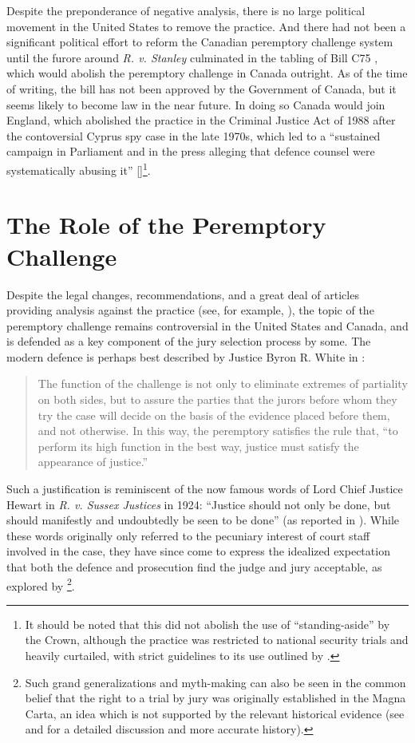 Despite the preponderance of negative analysis, there is no large political movement in the United States to remove the
practice. And there had not been a significant political effort to reform the Canadian peremptory challenge system until the
furore around \textit{R. v. Stanley} culminated in the tabling of Bill C75 \cite{c75legisinfo}, which would abolish the peremptory
challenge in Canada outright. As of the time of writing, the bill has not been approved by the Government of Canada, but it seems
likely to become law in the near future. In doing so Canada would join England, which abolished the practice in the Criminal
Justice Act of 1988 after the contoversial Cyprus spy case in the late 1970s, which led to a ``sustained campaign in Parliament
and in the press alleging that defence counsel were systematically abusing it'' [\cite{hoffman1997}]\footnote{It should be noted
  that this did not abolish the use of ``standing-aside'' by the Crown, although the practice was restricted to national security
  trials and heavily curtailed, with strict guidelines to its use outlined by \cite{attgenguide}.}.

\section{The Role of the Peremptory Challenge} \label{sec:roleper}

Despite the legal changes, recommendations, and a great deal of articles providing analysis against the practice (see, for
example, \cite{hoffman1997}), the topic of the peremptory challenge remains controversial in the United States and Canada, and is
defended as a key component of the jury selection process by some. The modern defence is perhaps best described by Justice Byron
R. White in \cite{swainvalabama}:

\begin{quote}
The function of the challenge is not only to eliminate extremes of partiality on both sides, but to assure the parties that the
jurors before whom they try the case will decide on the basis of the evidence placed before them, and not otherwise. In this way,
the peremptory satisfies the rule that, ``to perform its high function in the best way, justice must satisfy the appearance of
justice.''
\end{quote}

Such a justification is reminiscent of the now famous words of Lord Chief Justice Hewart in \textit{R. v. Sussex Justices} in 1924:
``Justice should not only be done, but should manifestly and undoubtedly be seen to be done'' (as reported in
\cite{oakes2016}). While these words originally only referred to the pecuniary interest of court staff involved in the case, they
have since come to express the idealized expectation that both the defence and prosecution find the judge and jury acceptable, as
explored by \cite{oakes2016}\footnote{Such grand generalizations and myth-making can also be seen in the common belief that the
  right to a trial by jury was originally established in the Magna Carta, an idea which is not supported by the relevant
  historical evidence (see \cite{hoffman1997} and \cite{vandykejurysel} for a detailed discussion and more accurate history).}.

